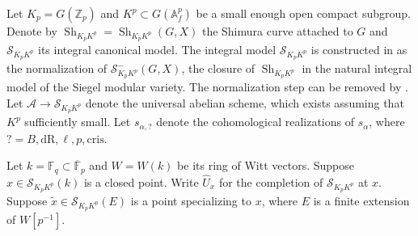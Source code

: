 \documentclass{amsart}
\numberwithin{equation}{subsection}
\numberwithin{theorem}{section}
\theoremstyle{definition}
\theoremstyle{remark}
\newcommand{\bA}{\mathbb{A}}
\newcommand{\bZ}{\mathbb{Z}}
\DeclareMathOperator{\Sh}{Sh}
\begin{document}
Let $K_p = G(\bZ_p)$ and $K^p\subset G(\bA_f^p)$ be a small enough open compact subgroup. Denote by $\Sh_{K_pK^p} = \Sh_{K_pK^p}(G,X)$ the Shimura curve attached to $G$ and $\mathscr{S}_{K_pK^p}$ its integral canonical model. The integral model $\mathscr{S}_{K_pK^p}$ is constructed in \cite{MR2669706} as the normalization of $\mathscr{S}_{K_pK^p}^-(G,X)$, the closure of $\Sh_{K_pK^p}$ in the natural integral model of the Siegel modular variety. The normalization step can be removed by \cite{MR4464238}. Let $ \mathcal{A} \to \mathscr{S}_{K_pK^p}$ denote the universal abelian scheme, which exists assuming that $K^p$ sufficiently small. Let $s_{\alpha, ?}$ denote the cohomological realizations of $s_{\alpha}$, where $ ? = B, \mathrm{dR}, \ell, p, \mathrm{cris}$. 

Let $k = \mathbb{F}_q \subset \overline{\mathbb{F}}_p$ and $W=W(k)$ be its ring of Witt vectors. Suppose $x\in \mathscr{S}_{K_pK^p}(k)$ is a closed point. Write $\widehat{U}_x$ for the completion of $\mathscr{S}_{K_pK^p}$ at $x$. Suppose $\tilde{x} \in \mathscr{S}_{K_pK^p}(E)$ is a point specializing to $x$, where $E$ is a finite extension of $W[p^{-1}]$.  
\end{document}
